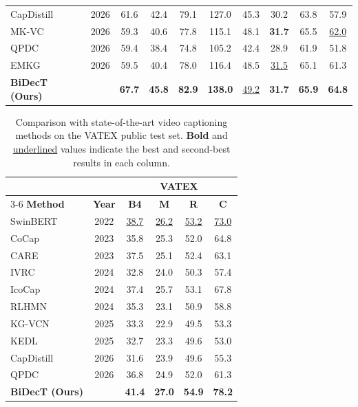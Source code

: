 \begin{table}[!t]
\begin{tabular}{l c cccc cccc}
CapDistill~\cite{luoDualhierarchicalKnowledgeDistillation2026} & 2026 & 61.6 & 42.4 & 79.1 & 127.0 & 45.3 & 30.2 & 63.8 & 57.9 \\
MK-VC~\cite{sunSceneAdaptiveDynamic2026} & 2026 & 59.3 & 40.6 & 77.8 & 115.1 & 48.1 & \textbf{31.7} & 65.5 & \underline{62.0} \\
QPDC~\cite{chenAskFocusMore2026} & 2026 & 59.4 & 38.4 & 74.8 & 105.2 & 42.4 & 28.9 & 61.9 & 51.8 \\
EMKG~\cite{sunGeneralizedVideoCaptioning2026} & 2026 & 59.5 & 40.4 & 78.0 & 116.4 & 48.5 & \underline{31.5} & 65.1 & 61.3 \\
\hline
\textbf{BiDecT (Ours)} & & \textbf{67.7} & \textbf{45.8} & \textbf{82.9} & \textbf{138.0} & \underline{49.2} & \textbf{31.7} & \textbf{65.9} & \textbf{64.8} \\
\hline\hline
\end{tabular}
\end{table}

\begin{table}[!t]
\caption{Comparison with state-of-the-art video captioning methods on the VATEX public test set. \textbf{Bold} and \underline{underlined} values indicate the best and second-best results in each column.}
\label{tab:sota_vatex}
\centering
\begin{tabular}{l c cccc}
\hline\hline
 & & \multicolumn{4}{c}{\textbf{VATEX}} \\
\cline{3-6}
\textbf{Method} & \textbf{Year} & \textbf{B4} & \textbf{M} & \textbf{R} & \textbf{C} \\
\hline
SwinBERT~\cite{linSwinBERTEndtoEndTransformers2022} & 2022 & \underline{38.7} & \underline{26.2} & \underline{53.2} & \underline{73.0} \\
CoCap~\cite{shenAccurateFastCompressed2023} & 2023 & 35.8 & 25.3 & 52.0 & 64.8 \\
CARE~\cite{yangConceptAwareVideoCaptioning2023} & 2023 & 37.5 & 25.1 & 52.4 & 63.1 \\
IVRC~\cite{tianRethinkVideoRetrieval2024} & 2024 & 32.8 & 24.0 & 50.3 & 57.4 \\
IcoCap~\cite{liangIcoCapImprovingVideo2024} & 2024 & 37.4 & 25.7 & 53.1 & 67.8 \\
RLHMN~\cite{liLearningHierarchicalModular2024} & 2024 & 35.3 & 23.1 & 50.9 & 58.8 \\
KG-VCN~\cite{yuanFullyExploringObject2025} & 2025 & 33.3 & 22.9 & 49.5 & 53.3 \\
KEDL~\cite{wangKnowledgeEnhancementDisentanglement2025} & 2025 & 32.7 & 23.3 & 49.6 & 53.0 \\
CapDistill~\cite{luoDualhierarchicalKnowledgeDistillation2026} & 2026 & 31.6 & 23.9 & 49.6 & 55.3 \\
QPDC~\cite{chenAskFocusMore2026} & 2026 & 36.8 & 24.9 & 52.0 & 61.3 \\
\hline
\textbf{BiDecT (Ours)} & & \textbf{41.4} & \textbf{27.0} & \textbf{54.9} & \textbf{78.2} \\
\hline\hline
\end{tabular}
\end{table}

